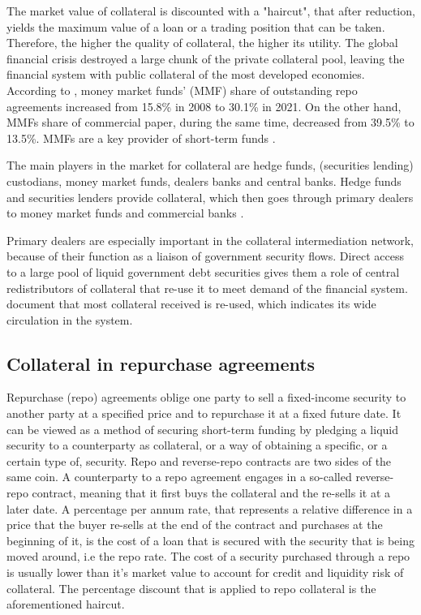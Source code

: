 \documentclass[11pt,a4paper,english,oneside]{article}
\begin{document}
The market value of collateral is discounted with a "haircut", that after reduction, yields the maximum value of a loan or a trading position that can be taken. Therefore, the higher the quality of collateral, the higher its utility. The global financial crisis destroyed a large chunk of the private collateral pool, leaving the financial system with public collateral of the most developed economies. According to \citet{ofr2021b}, money market funds' (MMF) share of outstanding repo agreements increased from 15.8\% in 2008 to 30.1\% in 2021. On the other hand, MMFs share of commercial paper, during the same time, decreased from 39.5\% to 13.5\%. MMFs are a key provider of short-term funds \citep{ofr2021}.

The main players in the market for collateral are hedge funds, (securities lending) custodians, money market funds, dealers banks and central banks. Hedge funds and securities lenders provide collateral, which then goes through primary dealers to money market funds and commercial banks \citep{singh2017}.

Primary dealers are especially important in the collateral intermediation network, because of their function as a liaison of government security flows. Direct access to a large pool of liquid government debt securities gives them a role of central redistributors of collateral that re-use it to meet demand of the financial system. \citet{infante2020} document that most collateral received is re-used, which indicates its wide circulation in the system.

\subsection{Collateral in repurchase agreements}

Repurchase (repo) agreements oblige one party to sell a fixed-income security to another party at a specified price and to repurchase it at a fixed future date. It can be viewed as a method of securing short-term funding by pledging a liquid security to a counterparty as collateral, or a way of obtaining a specific, or a certain type of, security. Repo and reverse-repo contracts are two sides of the same coin. A counterparty to a repo agreement engages in a so-called reverse-repo contract, meaning that it first buys the collateral and the re-sells it at a later date. A percentage per annum rate, that represents a relative difference in a price that the buyer re-sells at the end of the contract and purchases at the beginning of it, is the cost of a loan that is secured with the security that is being moved around, i.e the repo rate. The cost of a security purchased through a repo is usually lower than it's market value to account for credit and liquidity risk of collateral. The percentage discount that is applied to repo collateral is the aforementioned haircut.
\end{document}
